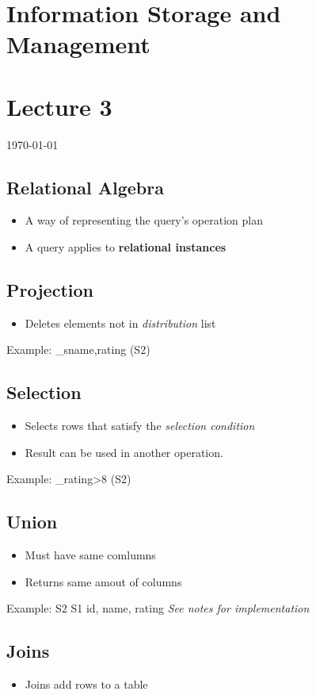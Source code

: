 \documentclass[12pt]{article}
\begin{document}
{\centering
\section*{Information Storage and Management}
\section*{Lecture 3}
\indent\today
}

\subsection*{Relational Algebra}
\begin{itemize}
    \item A way of representing the query's operation plan
    \item A query applies to \textbf{relational instances}
\end{itemize}
\subsection*{Projection \pi}
\begin{itemize}
    \item Deletes elements not in  \textit{distribution} list
\end{itemize}
\newline
\newline
Example: \pi_{sname,rating} (S2)

\subsection*{Selection \sigma}
\begin{itemize}
    \item Selects rows that satisfy the \textit{selection condition}
    \item Result can be used in another operation.
\end{itemize}
Example: \sigma_{rating>8} (S2)
\subsection*{Union \cup{}}
\begin{itemize}
    \item Must have same comlumns
    \item Returns same amout of columns
\end{itemize}
Example: S2\cup{} S1 \rightarrow{} id, name, rating
\newline
\newline
\textit{See notes for implementation}

\subsection*{Joins}
\begin{itemize}
    \item Joins add rows to a table
\end{itemize}
\end{document}
